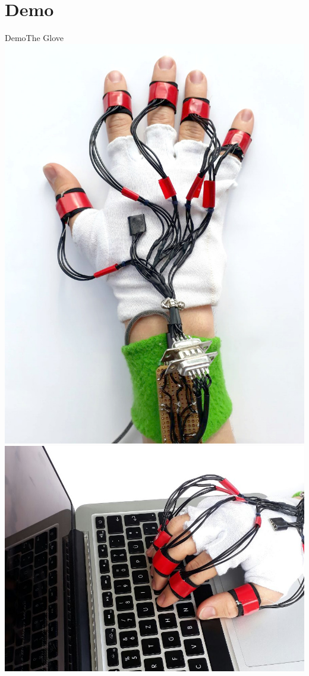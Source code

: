 \section{Demo}

\begin{frame}{Demo}{The Glove}
    \includegraphics[height=0.75\textheight]{../common/images/glove-top}
    \hfill
    \includegraphics[height=0.4\textwidth]{../common/images/glove-live}
\end{frame}


